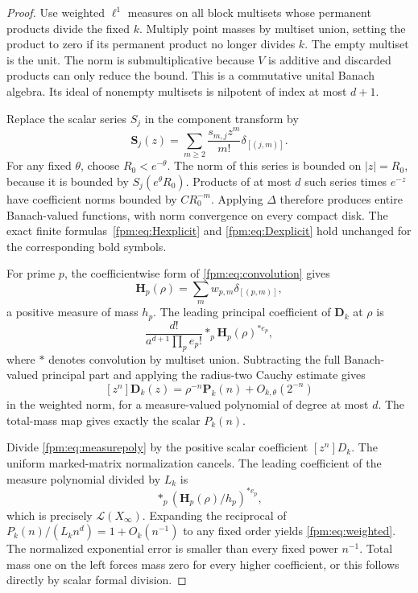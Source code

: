 \documentclass[11pt]{article}
\theoremstyle{definition}\newtheorem{definition}[theorem]{Definition}
\theoremstyle{remark}\newtheorem{remark}[theorem]{Remark}
\begin{document}
\begin{proof}
Use weighted $\ell^1$ measures on all block multisets whose permanent products divide the fixed $k$. Multiply point masses by multiset union, setting the product to zero if its permanent product no longer divides $k$. The empty multiset is the unit. The norm is submultiplicative because $V$ is additive and discarded products can only reduce the bound. This is a commutative unital Banach algebra. Its ideal of nonempty multisets is nilpotent of index at most $d+1$.

Replace the scalar series $S_j$ in the component transform by
\[
 \boldsymbol S_j(z)=\sum_{m\ge2}\frac{s_{m,j}z^m}{m!}\delta_{[(j,m)]}.
\]
For any fixed $\theta$, choose $R_0<e^{-\theta}$. The norm of this series is bounded on $|z|=R_0$, because it is bounded by $S_j(e^\theta R_0)$. Products of at most $d$ such series times $e^{-z}$ have coefficient norms bounded by $C R_0^{-m}$. Applying $\Delta$ therefore produces entire Banach-valued functions, with norm convergence on every compact disk. The exact finite formulas~\eqref{fpm:eq:Hexplicit} and \eqref{fpm:eq:Dexplicit} hold unchanged for the corresponding bold symbols.

For prime $p$, the coefficientwise form of \eqref{fpm:eq:convolution} gives
\[
 \boldsymbol H_p(\rho)=\sum_m w_{p,m}\delta_{[(p,m)]},
\]
a positive measure of mass $h_p$. The leading principal coefficient of $\boldsymbol D_k$ at $\rho$ is
\[
 \frac{d!}{a^{d+1}\prod_pe_p!}
 \mathop{*}_p\boldsymbol H_p(\rho)^{*e_p},
\]
where $*$ denotes convolution by multiset union. Subtracting the full Banach-valued principal part and applying the radius-two Cauchy estimate gives
\begin{equation}\label{fpm:eq:measurepoly}
 [z^n]\boldsymbol D_k(z)=\rho^{-n}\boldsymbol P_k(n)
 +O_{k,\theta}(2^{-n})
\end{equation}
in the weighted norm, for a measure-valued polynomial of degree at most $d$. The total-mass map gives exactly the scalar $P_k(n)$.

Divide \eqref{fpm:eq:measurepoly} by the positive scalar coefficient $[z^n]D_k$. The uniform marked-matrix normalization cancels. The leading coefficient of the measure polynomial divided by $L_k$ is
\[
 \mathop{*}_p(\boldsymbol H_p(\rho)/h_p)^{*e_p},
\]
which is precisely $\mathcal L(X_\infty)$. Expanding the reciprocal of
$P_k(n)/(L_kn^d)=1+O_k(n^{-1})$ to any fixed order yields \eqref{fpm:eq:weighted}. The normalized exponential error is smaller than every fixed power $n^{-1}$. Total mass one on the left forces mass zero for every higher coefficient, or this follows directly by scalar formal division.
\end{proof}
\end{document}

